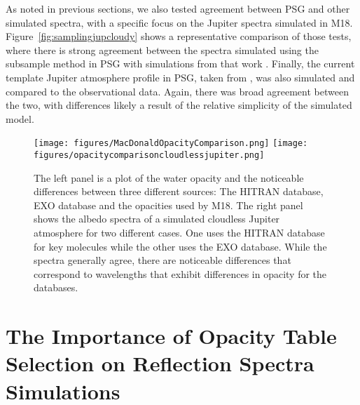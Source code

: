 \documentclass[12pt, letterpaper]{aastex631}
\begin{document}
As noted in previous sections, we also tested agreement between PSG and other simulated spectra, with a specific focus on the Jupiter spectra simulated in M18.  Figure~\ref{fig:samplingjupcloudy} shows a representative comparison of those tests, where there is strong agreement between the spectra simulated using the subsample method in PSG with simulations from that work \citep{2018ApJ...858...69M}.  Finally, the current template Jupiter atmosphere profile in PSG, taken from  \citep{doi:10.1029/2005JE002411}, was also simulated and compared to the observational data.  Again, there was broad agreement between the two, with differences likely a result of the relative simplicity of the simulated model. 

\begin{figure*}[t!]
  \centering
  {\texttt{[image: figures/MacDonaldOpacityComparison.png]}}
  \texttt{[image: figures/opacitycomparisoncloudlessjupiter.png]}
  \caption{The left panel is a plot of the water opacity and the noticeable differences between three different sources: The HITRAN database, EXO database and the opacities used by M18.  The right panel shows the albedo spectra of a simulated cloudless Jupiter atmosphere for two different cases.  One uses the HITRAN database for key molecules while the other uses the EXO database.  While the spectra generally agree, there are noticeable differences that correspond to wavelengths that exhibit differences in opacity for the databases.   }
  \label{fig:opacity}
\end{figure*}

\section{The Importance of Opacity Table Selection on Reflection Spectra Simulations} \label{sec:opacitytables}
\end{document}
